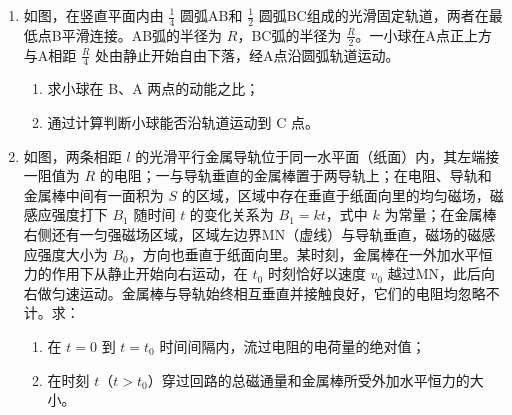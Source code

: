 \documentclass[\gkver]{gaokaozhenti}
\begin{document}
\begin{enumerate}
\item
如图，在竖直平面内由 $\frac{1}{4}$ 圆弧AB和 $\frac{1}{2}$ 圆弧BC组成的光滑固定轨道，两者在最低点B平滑连接。AB弧的半径为 $R$，BC弧的半径为 $\frac{R}{2}$。一小球在A点正上方与A相距 $\frac{R}{4}$ 处由静止开始自由下落，经A点沿圆弧轨道运动。
\begin{enumerate}
	\item
	求小球在 B、A 两点的动能之比；
	\item
	通过计算判断小球能否沿轨道运动到 C 点。
\end{enumerate}
\onepicture[align=right, w=4.25cm]{}


\item
如图，两条相距 $l$ 的光滑平行金属导轨位于同一水平面（纸面）内，其左端接一阻值为 $R$ 的电阻；一与导轨垂直的金属棒置于两导轨上；在电阻、导轨和金属棒中间有一面积为 $S$ 的区域，区域中存在垂直于纸面向里的均匀磁场，磁感应强度打下 $B_{1}$ 随时间 $t$ 的变化关系为 $B_{1}=kt$，式中 $k$ 为常量；在金属棒右侧还有一匀强磁场区域，区域左边界MN（虚线）与导轨垂直，磁场的磁感应强度大小为 $B_{0}$，方向也垂直于纸面向里。某时刻，金属棒在一外加水平恒力的作用下从静止开始向右运动，在 $t_{0}$ 时刻恰好以速度 $v_{0}$ 越过MN，此后向右做匀速运动。金属棒与导轨始终相互垂直并接触良好，它们的电阻均忽略不计。求：
\begin{enumerate}
	\item
	在 $t=0$ 到 $t=t_{0}$ 时间间隔内，流过电阻的电荷量的绝对值；
	\item
	在时刻 $t$（$t>t_{0}$）穿过回路的总磁通量和金属棒所受外加水平恒力的大小。
\end{enumerate}


\end{enumerate}
\end{document}
